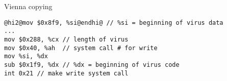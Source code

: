 
\begin{frame}[fragile,label=virusWriting]{Vienna copying}
\begin{lstlisting}
@hi2@mov $0x8f9, %si@endhi@ // %si = beginning of virus data
...
mov $0x288, %cx // length of virus
mov $0x40, %ah  // system call # for write
mov %si, %dx
sub $0x1f9, %dx // %dx = beginning of virus code
int 0x21 // make write system call
\end{lstlisting}
\end{frame}


